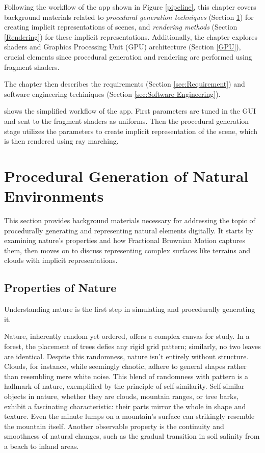 \label{sec:Preparation}

Following the workflow of the app shown in Figure \ref{pipeline}, this chapter covers background materials related to \textit{procedural generation techniques} (Section \ref{Procedural Generation}) for creating implicit representations of scenes, and \textit{rendering methods} (Section \ref{Rendering}) for these implicit representations. Additionally, the chapter explores shaders and Graphics Processing Unit (GPU) architecture (Section \ref{GPU}), crucial elements since procedural generation and rendering are performed using fragment shaders.

The chapter then describes the requirements (Section \ref{sec:Requirement}) and software engineering techiniques (Section \ref{sec:Software Engineering}).


{shows the simplified workflow of the app. First parameters are tuned in the GUI and sent to the fragment shaders as uniforms. Then the procedural generation stage utilizes the parameters to create implicit representation of the scene, which is then rendered using ray marching.}


\section{Procedural Generation of Natural Environments}
\label{Procedural Generation}

This section provides background materials necessary for addressing the topic of procedurally generating and representing natural elements digitally. It starts by examining nature's properties and how Fractional Brownian Motion captures them, then moves on to discuss representing complex surfaces like terrains and clouds with implicit representations.

\subsection{Properties of Nature}
\label{Properties of Nature}

Understanding nature is the first step in simulating and procedurally generating it.

Nature, inherently random yet ordered, offers a complex canvas for study. In a forest, the placement of trees defies any rigid grid pattern; similarly, no two leaves are identical. Despite this randomness, nature isn't entirely without structure. Clouds, for instance, while seemingly chaotic, adhere to general shapes rather than resembling mere white noise. This blend of randomness with pattern is a hallmark of nature, exemplified by the principle of self-similarity. Self-similar objects in nature, whether they are clouds, mountain ranges, or tree barks, exhibit a fascinating characteristic: their parts mirror the whole in shape and texture. Even the minute lumps on a mountain's surface can strikingly resemble the mountain itself. Another observable property is the continuity and smoothness of natural changes, such as the gradual transition in soil salinity from a beach to inland areas.

